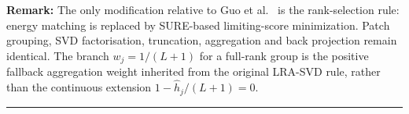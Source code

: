 \begin{center}
\begin{minipage}{0.88\textwidth}
{\vspace{0.2em}
{\noindent\textbf{Remark:} The only modification relative to Guo et al.\ \cite{guo2016efficient} is the rank-selection rule: energy matching is replaced by SURE-based limiting-score minimization. Patch grouping, SVD factorisation, truncation, aggregation and back projection remain identical. The branch $w_j=1/(L+1)$ for a full-rank group is the positive fallback aggregation weight inherited from the original LRA-SVD rule, rather than the continuous extension $1-\widehat h_j/(L+1)=0$.\par}
}
\vspace{0.25em}
\hrule
\end{minipage}
\end{center}